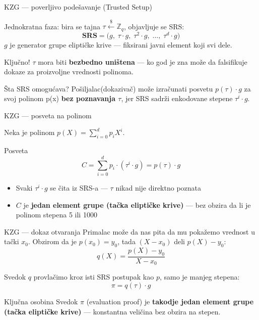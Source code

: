 \documentclass[aspectratio=1610]{beamer}
\newcommand{\keyword}[1]{\textcolor{wcprimary}{\textbf{#1}}}
\begin{document}
\begin{frame}{KZG — poverljivo podešavanje (Trusted Setup)}

Jednokratna faza: bira se tajna $\tau \xleftarrow{\$} \mathbb{Z}_q$, objavljuje se SRS:
\[
  \mathbf{SRS} = \bigl(g,\; \tau \cdot g,\; \tau^2 \cdot g,\; \ldots,\; \tau^d \cdot g\bigr)
\]
$g$ je generator grupe eliptičke krive — fiksirani javni element koji svi dele.


\begin{alertblock}{Ključno!}
  $\tau$ mora biti \keyword{bezbedno uništena} — ko god je zna može da falsifikuje
  dokaze za proizvoljne vrednosti polinoma.
\end{alertblock}

\begin{exampleblock}{Šta SRS omogućava?}
  Pošiljalac(dokazivač) može izračunati posvetu $p(\tau) \cdot g$ za svoj polinom p(x) \keyword{bez poznavanja $\tau$},
  jer SRS sadrži enkodovane stepene $\tau^i \cdot g$.
\end{exampleblock}
\end{frame}

\begin{frame}{KZG — posveta na polinom}

Neka je polinom $p(X) = \sum_{i=0}^{d} p_i X^i$.


\begin{block}{Posveta}
  \[
    C = \sum_{i=0}^{d} p_i \cdot (\tau^i \cdot g) = p(\tau) \cdot g
  \]
\end{block}


\begin{itemize}
  
  \item Svaki $\tau^i \cdot g$ se čita iz SRS-a — $\tau$ nikad nije direktno poznata
  \item $C$ je \keyword{jedan element grupe (tačka eliptičke krive)} — bez obzira da li je polinom stepena 5 ili 1000
\end{itemize}
\end{frame}

\begin{frame}{KZG — dokaz otvaranja}
Primalac može da nas pita da mu pokažemo vrednost u tački $x_0$.
Obzirom da je $p(x_0) = y_0$, tada $(X - x_0)$ deli $p(X) - y_0$:
\[
  q(X) = \frac{p(X) - y_0}{X - x_0}
\]
\begin{block}{Svedok}
  $q$ provlačimo kroz isti SRS postupak kao $p$, samo je manjeg stepena:
  \[
     \pi = q(\tau) \cdot g
  \] 
\end{block}
\begin{exampleblock}{Ključna osobina}
  Svedok $\pi$ (evaluation proof) je \keyword{takodje jedan element grupe (tačka eliptičke krive)} — konstantna veličina bez obzira na stepen.
\end{exampleblock}
\end{frame}
\end{document}

